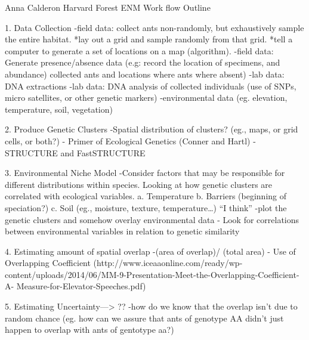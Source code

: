 Anna Calderon
Harvard Forest
ENM Work flow  Outline


1. Data Collection 
	-field data: collect ants non-randomly, but exhaustively sample the 	entire habitat. 
   *lay out a grid and sample randomly from that grid. 
   *tell a computer to generate a set of locations on a map (algorithm). 
	-field data: Generate presence/absence data (e.g: record the 			location of specimens, and abundance)	
	 collected ants and locations where ants where absent)
	-lab data: DNA extractions
	-lab data: DNA analysis of collected individuals (use of SNPs, micro 
	 satellites, or 	
	 other genetic markers)
	-environmental data (eg. elevation, temperature, soil, vegetation)

2. Produce Genetic Clusters
	-Spatial distribution of clusters? (eg., maps, or grid cells, or both?)
    - Primer of Ecological Genetics (Conner and Hartl)
    - STRUCTURE and FastSTRUCTURE

3. Environmental Niche Model
	-Consider factors that may be responsible for different distributions within 	 species. Looking at how genetic clusters are correlated with ecological variables. 
		a. Temperature
		b. Barriers (beginning of speciation?)
		c. Soil (eg., moisture, texture, temperature…)
	“I think”	
	-plot the genetic clusters and somehow overlay environmental data
	- Look for correlations between environmental variables in relation to genetic similarity
  
4. Estimating amount of spatial overlap
	-(area of overlap)/ (total area)
	- Use of Overlapping Coefficient (http://www.iceaaonline.com/ready/wp-	
	content/uploads/2014/06/MM-9-Presentation-Meet-the-Overlapping-Coefficient-A-	Measure-for-Elevator-Speeches.pdf) 

5. Estimating Uncertainty—> ?? 
	-how do we know that the overlap isn’t due to random chance (eg. how can we 	assure that ants of genotype AA didn’t just happen to overlap with ants of 		gentotype aa?) 

	
